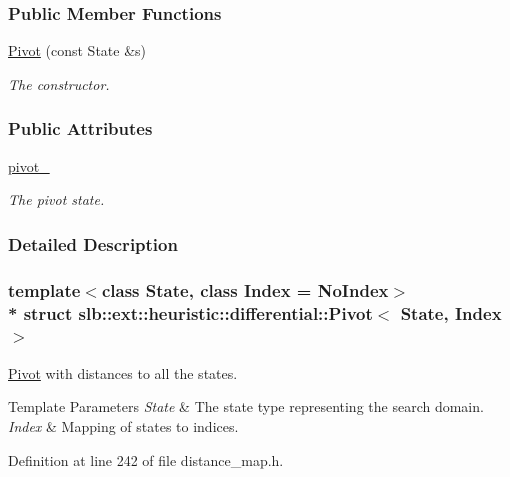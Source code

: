 \subsubsection*{Public Member Functions}
\begin{DoxyCompactItemize}
\item 
\hyperlink{structslb_1_1ext_1_1heuristic_1_1differential_1_1Pivot_a22b0f4183d30086f01e0a484bd7e2ba1}{Pivot} (const State \&s)
\begin{DoxyCompactList}\small\item\em The constructor. \end{DoxyCompactList}\end{DoxyCompactItemize}
\subsubsection*{Public Attributes}
\begin{DoxyCompactItemize}
\item 
\hyperlink{structslb_1_1ext_1_1heuristic_1_1differential_1_1Pivot_a2f57332bf75dfffe318f3c4c2d4fc5a7}{pivot\+\_\+}
\begin{DoxyCompactList}\small\item\em The pivot state. \end{DoxyCompactList}\end{DoxyCompactItemize}


\subsubsection{Detailed Description}
\subsubsection*{template$<$class State, class Index = No\+Index$>$\\*
struct slb\+::ext\+::heuristic\+::differential\+::\+Pivot$<$ State, Index $>$}

\hyperlink{structslb_1_1ext_1_1heuristic_1_1differential_1_1Pivot}{Pivot} with distances to all the states. 


\begin{DoxyTemplParams}{Template Parameters}
{\em State} & The state type representing the search domain. \\
\hline
{\em Index} & Mapping of states to indices. \\
\hline
\end{DoxyTemplParams}


Definition at line 242 of file distance\+\_\+map.\+h.



